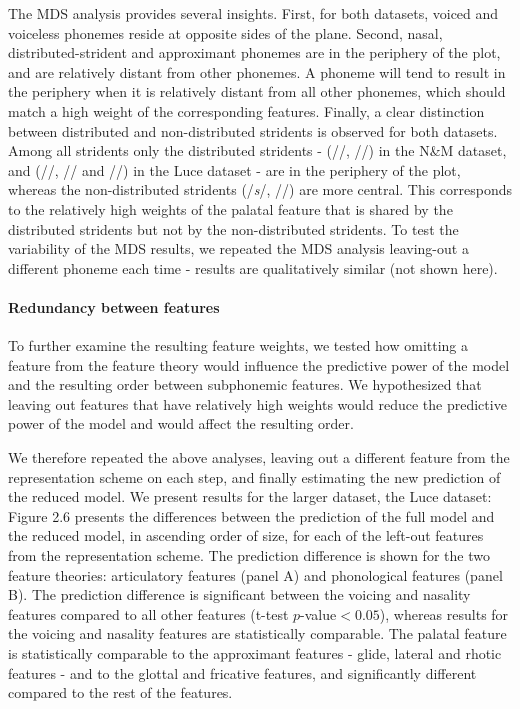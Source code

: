 The MDS analysis provides several insights. First, for both datasets, voiced and voiceless phonemes reside at opposite sides of the plane. Second, nasal, distributed-strident and approximant phonemes are in the periphery of the plot, and are relatively distant from other phonemes. A phoneme will tend to result in the periphery when it is relatively distant from all other phonemes, which should match a high weight of the corresponding features. Finally, a clear distinction between distributed and non-distributed stridents is observed for both datasets. Among all stridents only the distributed stridents - (//, //) in the N\&M dataset, and (//, // and //) in the Luce dataset - are in the periphery of the plot, whereas the non-distributed stridents (/\textit{s}/, //) are more central. This corresponds to the relatively high weights of the palatal feature that is shared by the distributed stridents but not by the non-distributed stridents. To test the variability of the MDS results, we repeated the MDS analysis leaving-out a different phoneme each time - results are qualitatively similar (not shown here).

\paragraph{Redundancy between features} To further examine the resulting feature weights, we tested how omitting a feature from the feature theory would influence the predictive power of the model and the resulting order between subphonemic features. We hypothesized that leaving out features that have relatively high weights would reduce the predictive power of the model and would affect the resulting order.

We therefore repeated the above analyses, leaving out a different feature from the representation scheme on each step, and finally estimating the new prediction of the reduced model. We present results for the larger dataset, the Luce dataset: Figure 2.6 presents the differences between the prediction of the full model and the reduced model, in ascending order of size, for each of the left-out features from the representation scheme. The prediction difference is shown for the two feature theories: articulatory features (panel A) and phonological features (panel B). The prediction difference is significant between the voicing and nasality features compared to all other features (t-test $p$-value$<0.05$), whereas results for the voicing and nasality features are statistically comparable. The palatal feature is statistically comparable to the approximant features - glide, lateral and rhotic features - and to the glottal and fricative features, and significantly different compared to the rest of the features.


